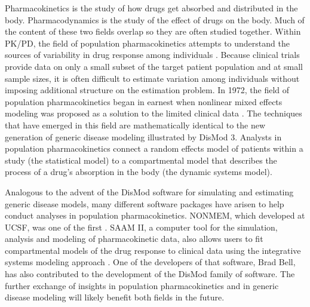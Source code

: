 Pharmacokinetics is the study of how drugs get absorbed and
distributed in the body. Pharmacodynamics is the study of the effect
of drugs on the body. Much of the content of these two fields overlap
so they are often studied together. Within PK/PD, the field of
population pharmacokinetics attempts to understand the sources of
variability in drug response among individuals
\cite{Yuh_Population_1994}. Because clinical trials provide data on
only a small subset of the target patient population and at small
sample sizes, it is often difficult to estimate variation among
individuals without imposing additional structure on the estimation
problem. In 1972, the field of population pharmacokinetics began in
earnest when nonlinear mixed effects modeling was proposed as a
solution to the limited clinical data
\cite{Sheiner_Modelling_1972}. The techniques that have emerged in
this field are mathematically identical to the new generation of
generic disease modeling illustrated by DisMod 3. Analysts in
population pharmacokinetics connect a random effects model of patients
within a study (the statistical model) to a compartmental model that
describes the process of a drug's absorption in the body (the dynamic
systems model).

Analogous to the advent of the DisMod software for simulating and
estimating generic disease models, many different software packages
have arisen to help conduct analyses in population
pharmacokinetics. NONMEM, which developed at UCSF, was one of the
first \cite{Beal_NONMEM_2009}. SAAM II, a computer tool for the
simulation, analysis and modeling of pharmacokinetic data, also allows
users to fit compartmental models of the drug response to clinical
data using the integrative systems modeling approach
\cite{Barrett_SAAM_1998}. One of the developers of that software,
Brad Bell, has also contributed to the development of the DisMod
family of software. The further exchange of insights in population
pharmacokinetics and in generic disease modeling will likely benefit
both fields in the future.




